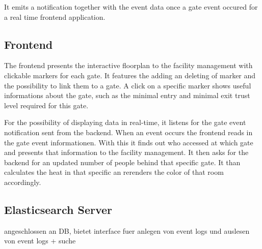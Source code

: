 It emits a notification together with the event data once a gate event occured for a real time frontend application.


\subsection{Frontend}
\label{Frontend}

The frontend presents the interactive floorplan to the facility management with clickable markers for each gate.
It features the adding an deleting of marker and the possibility to link them to a gate.
A click on a specific marker shows useful informations about the gate, such as the minimal entry and minimal exit trust level required for this gate.

For the possibility of displaying data in real-time, it listens for the gate event notification sent from the backend. When an event occurs the frontend reads in the gate event informationen. With this it finds out who accessed at which gate and presents that information to the facility management. It then asks for the backend for an updated number of people behind that specific gate. It than calculates the heat in that specific an rerenders the color of that room accordingly.

\subsection{Elasticsearch Server}
\label{Elasticsearch Server}

angeschlossen an DB, bietet interface fuer anlegen von event logs und auslesen von event logs + suche

\clearpage



